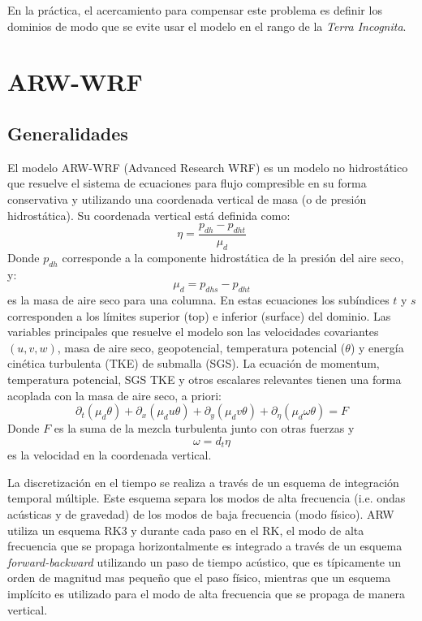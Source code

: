 En la práctica, el acercamiento para compensar este problema es definir los dominios de modo que se evite usar el modelo en el rango de la \emph{Terra Incognita}.
\section{ARW-WRF}
\subsection{Generalidades}
El modelo ARW-WRF (Advanced Research WRF) es un modelo no hidrostático que resuelve el sistema de ecuaciones para flujo compresible en su forma conservativa y utilizando una coordenada vertical de masa (o de presión hidrostática). Su coordenada vertical está definida como:
\begin{equation}
\eta = \frac{p_{dh}-p_{dht}}{\mu_d}
\end{equation}
Donde $p_{dh}$ corresponde a la componente hidrostática de la presión del aire seco, y:
\begin{equation}
\mu_d = p_{dhs} - p_{dht}
\end{equation}
es la masa de aire seco para una columna. En estas ecuaciones los subíndices $t$ y $s$ corresponden a los límites superior (top) e inferior (surface) del dominio. Las variables principales que resuelve el modelo son las velocidades covariantes $(u,v,w)$, masa de aire seco, geopotencial, temperatura potencial ($\theta$) y energía cinética turbulenta (TKE) de submalla (SGS). La ecuación de momentum, temperatura potencial, SGS TKE y otros escalares relevantes tienen una forma acoplada con la masa de aire seco, a priori:
\begin{equation}
\partial_t (\mu_d\theta) + \partial_x(\mu_d u \theta)+\partial_y(\mu_d v \theta)+\partial_\eta (\mu_d \omega \theta) = F
\end{equation}
Donde $F$ es la suma de la mezcla turbulenta junto con otras fuerzas y
\begin{equation}
\omega = d_t\eta
\end{equation}
es la velocidad en la coordenada vertical.

La discretización en el tiempo se realiza a través de un esquema de integración temporal múltiple. Este esquema separa los modos de alta frecuencia (i.e. ondas acústicas y de gravedad) de los modos de baja frecuencia (modo físico). ARW utiliza un esquema RK3 y durante cada paso en el RK, el modo de alta frecuencia que se propaga horizontalmente es integrado a través de un esquema \emph{forward-backward} utilizando un paso de tiempo acústico, que es típicamente un orden de magnitud mas pequeño que el paso físico, mientras que un esquema implícito es utilizado para el modo de alta frecuencia que se propaga de manera vertical.

